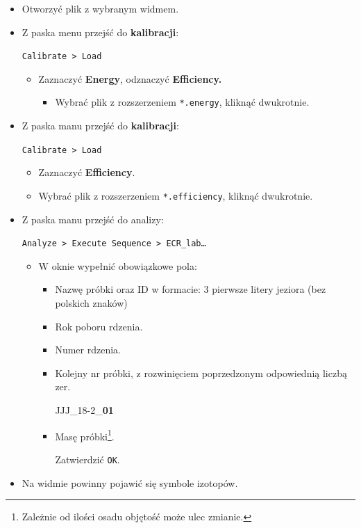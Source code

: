 \documentclass[
  letterpaper,
  DIV=11,
  numbers=noendperiod]{scrreprt}
\providecommand{\tightlist}{%
  \setlength{\itemsep}{0pt}\setlength{\parskip}{0pt}}\usepackage{longtable,booktabs,array}
\begin{document}
\begin{itemize}
\item
  Otworzyć plik z wybranym widmem.
\item
  Z paska menu przejść do \textbf{kalibracji}:

  \texttt{Calibrate\ \textgreater{}\ Load}

  \begin{itemize}
  \item
    Zaznaczyć \textbf{Energy}, odznaczyć \textbf{Efficiency.}

    \begin{itemize}
    \tightlist
    \item
      Wybrać plik z rozszerzeniem \texttt{*.energy}, kliknąć dwukrotnie.
    \end{itemize}
  \end{itemize}
\item
  Z paska manu przejść do \textbf{kalibracji}:

  \texttt{Calibrate\ \textgreater{}\ Load}

  \begin{itemize}
  \item
    Zaznaczyć \textbf{Efficiency}.
  \item
    Wybrać plik z rozszerzeniem \texttt{*.efficiency}, kliknąć
    dwukrotnie.
  \end{itemize}
\item
  Z paska manu przejść do analizy:

  \texttt{Analyze\ \textgreater{}\ Execute\ Sequence\ \textgreater{}\ ECR\_lab…}

  \begin{itemize}
  \item
    W oknie wypełnić obowiązkowe pola:

    \begin{itemize}
    \item
      Nazwę próbki oraz ID w formacie: 3 pierwsze litery jeziora (bez
      polskich znaków)
    \item
      Rok poboru rdzenia.
    \item
      Numer rdzenia.
    \item
      Kolejny nr próbki, z rozwinięciem poprzedzonym odpowiednią liczbą
      zer.

      JJJ\_18-2\_\textbf{01}
    \item
      Masę próbki\footnote{Zależnie od ilości osadu objętość może ulec
        zmianie.}.

      Zatwierdzić \texttt{OK}.
    \end{itemize}
  \end{itemize}
\item
  Na widmie powinny pojawić się symbole izotopów.


\end{itemize}
\end{document}
